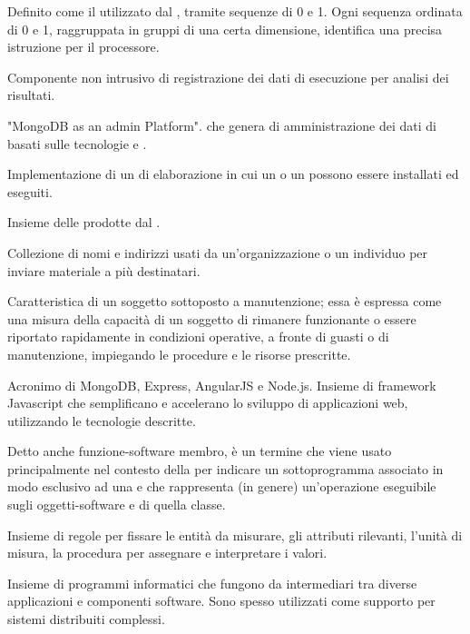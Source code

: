 {Definito come il  utilizzato dal , tramite sequenze di 0 e 1. Ogni sequenza ordinata di 0 e 1, raggruppata in gruppi di una certa dimensione, identifica una precisa istruzione per il processore.}

{Componente non intrusivo di registrazione dei dati di esecuzione per analisi dei risultati.}




{"MongoDB as an admin Platform".  che genera   di amministrazione dei dati di  basati sulle tecnologie e .}

{Implementazione  di un  di elaborazione in cui un  o un  possono essere installati ed eseguiti.}

{Insieme delle  prodotte dal  .}

{Collezione di nomi e indirizzi usati da un'organizzazione o un individuo per inviare materiale a più destinatari.}

{Caratteristica di un soggetto sottoposto a manutenzione; essa è espressa come una misura della capacità di un soggetto di rimanere funzionante o essere riportato rapidamente in condizioni operative, a fronte di guasti o di manutenzione, impiegando le procedure e le risorse prescritte. }

{Acronimo di MongoDB, Express, AngularJS e Node.js. Insieme di framework Javascript che semplificano e accelerano lo sviluppo di applicazioni web, utilizzando le tecnologie descritte.}

{Detto anche funzione-software membro, è un termine che viene usato principalmente nel contesto della   per indicare un sottoprogramma associato in modo esclusivo ad una  e che rappresenta (in genere) un'operazione eseguibile sugli oggetti-software e  di quella classe.}

{Insieme di regole per fissare le entità da misurare, gli attributi rilevanti, l'unità di misura, la procedura per assegnare e interpretare i valori.}

{Insieme di programmi informatici che fungono da intermediari tra diverse applicazioni e componenti software. Sono spesso utilizzati come supporto per sistemi distribuiti complessi.}

